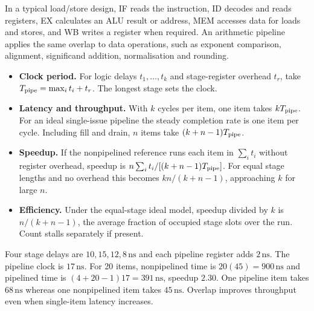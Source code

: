 \documentclass[12pt,a4paper]{article}
\begin{document}
In a typical load/store design, IF reads the instruction, ID decodes and reads registers, EX calculates an ALU result or address, MEM accesses data for loads and stores, and WB writes a register when required. An arithmetic pipeline applies the same overlap to data operations, such as exponent comparison, alignment, significand addition, normalisation and rounding.
\begin{itemize}[leftmargin=*,itemsep=3pt]
\item \textbf{Clock period.} For logic delays $t_1,\ldots,t_k$ and stage-register overhead $t_r$, take $T_{\rm pipe}=\max_i t_i+t_r$. The longest stage sets the clock.
\item \textbf{Latency and throughput.} With $k$ cycles per item, one item takes $kT_{\rm pipe}$. For an ideal single-issue pipeline the steady completion rate is one item per cycle. Including fill and drain, $n$ items take $(k+n-1)T_{\rm pipe}$.
\item \textbf{Speedup.} If the nonpipelined reference runs each item in $\sum_i t_i$ without register overhead, speedup is $n\sum_i t_i/[(k+n-1)T_{\rm pipe}]$. For equal stage lengths and no overhead this becomes $kn/(k+n-1)$, approaching $k$ for large $n$.
\item \textbf{Efficiency.} Under the equal-stage ideal model, speedup divided by $k$ is $n/(k+n-1)$, the average fraction of occupied stage slots over the run. Count stalls separately if present.
\end{itemize}
\begin{tcolorbox}[examplebox,title={Unequal stages and finite workload}]
Four stage delays are $10,15,12,8\,\mathrm{ns}$ and each pipeline register adds $2\,\mathrm{ns}$. The pipeline clock is $17\,\mathrm{ns}$. For 20 items, nonpipelined time is $20(45)=900\,\mathrm{ns}$ and pipelined time is $(4+20-1)17=391\,\mathrm{ns}$, speedup $2.30$. One pipeline item takes $68\,\mathrm{ns}$ whereas one nonpipelined item takes $45\,\mathrm{ns}$. Overlap improves throughput even when single-item latency increases.
\end{tcolorbox}
\end{document}

